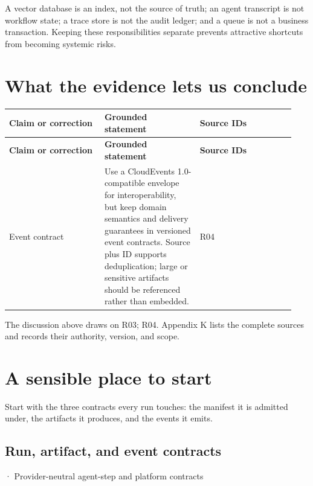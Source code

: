 A vector database is an index, not the source of truth; an agent transcript is not workflow state; a trace store is not the audit ledger; and a queue is not a business transaction. Keeping these responsibilities separate prevents attractive shortcuts from becoming systemic risks.\par

\section{What the evidence lets us conclude}

\BookTableStart
\small
\begin{longtable}{@{}Y{0.3133\linewidth}Y{0.3133\linewidth}Y{0.3133\linewidth}@{}}
\color{white}\bfseries \textbf{Claim or correction} & \color{white}\bfseries \textbf{Grounded statement} & \color{white}\bfseries \textbf{Source IDs} \\
\endfirsthead
{}
\color{white}\bfseries \textbf{Claim or correction} & \color{white}\bfseries \textbf{Grounded statement} & \color{white}\bfseries \textbf{Source IDs} \\
\endhead
Event contract & Use a CloudEvents 1.0-compatible envelope for interoperability, but keep domain semantics and delivery guarantees in versioned event contracts. Source plus ID supports deduplication; large or sensitive artifacts should be referenced rather than embedded. & R04 \\
\end{longtable}
\BookTableEnd

The discussion above draws on R03; R04. Appendix K lists the complete sources and records their authority, version, and scope.\par

\section{A sensible place to start}

Start with the three contracts every run touches: the manifest it is admitted under, the artifacts it produces, and the events it emits.\par

\subsection{Run, artifact, and event contracts}

\BookSnake · Provider-neutral agent-step and platform contracts\par

